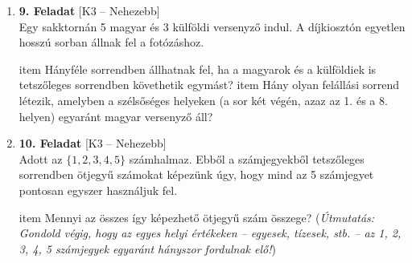 \documentclass[12pt,a4paper]{article}
\begin{document}
\begin{enumerate}[label=\arabic*., leftmargin=*]
    \vspace{0.4cm}

    \item \textbf{9. Feladat} \textsf{\small [K3 – Nehezebb]} \\
    Egy sakktornán 5 magyar és 3 külföldi versenyző indul. A díjkiosztón egyetlen hosszú sorban állnak fel a fotózáshoz.
    \begin{enumerate}[label=\alph*)]
        item Hányféle sorrendben állhatnak fel, ha a magyarok és a külföldiek is tetszőleges sorrendben követhetik egymást?
        item Hány olyan felállási sorrend létezik, amelyben a szélsőséges helyeken (a sor két végén, azaz az 1. és a 8. helyen) egyaránt magyar versenyző áll?
    \end{enumerate}

    \vspace{0.4cm}

    \item \textbf{10. Feladat} \textsf{\small [K3 – Nehezebb]} \\
    Adott az $\{1, 2, 3, 4, 5\}$ számhalmaz. Ebből a számjegyekből tetszőleges sorrendben ötjegyű számokat képezünk úgy, hogy mind az 5 számjegyet pontosan egyszer használjuk fel.
    \begin{enumerate}[label=\alph*)]
        item Mennyi az összes így képezhető ötjegyű szám összege? (\emph{Útmutatás: Gondold végig, hogy az egyes helyi értékeken – egyesek, tízesek, stb. – az 1, 2, 3, 4, 5 számjegyek egyaránt hányszor fordulnak elő!})
    \end{enumerate}

\end{enumerate}
\end{document}
